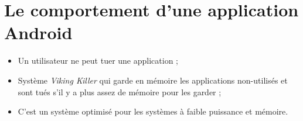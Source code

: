 \section{Le comportement d'une application Android}
\begin{itemize}
    \item Un utilisateur ne peut tuer une application ;
    \item Système \emph{Viking Killer} qui garde en mémoire les applications non-utilisés et sont tués s'il y a plus assez de mémoire pour les garder ;
    \item C'est un système optimisé pour les systèmes à faible puissance et mémoire.
\end{itemize}
